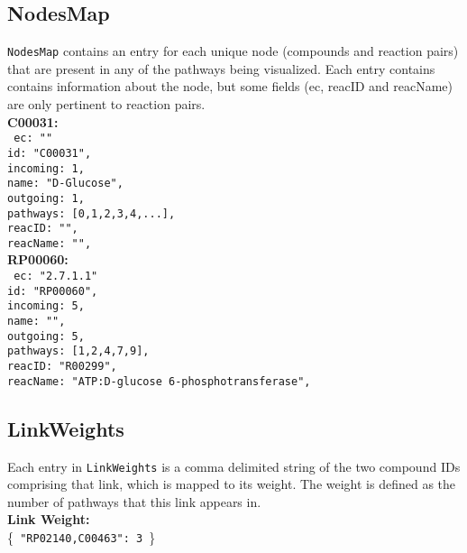 \documentclass{article}
\begin{document}
			\subsection{NodesMap}
			\texttt{NodesMap} contains an entry for each unique node (compounds and reaction pairs) that are present in any of the pathways being visualized. Each entry contains contains information about the node, but some fields (ec, reacID and reacName) are only pertinent to reaction pairs.\\
			
			\noindent \textbf{C00031:}\\
				\texttt{
					\indent ec:	"" \\
					\indent id:	"C00031",\\
					\indent incoming: 1,\\
					\indent name:	"D-Glucose",\\
					\indent outgoing: 1,\\
					\indent pathways: [0,1,2,3,4,...],\\
					\indent reacID:	"",\\
					\indent reacName: "",\\
				}
			\noindent \textbf{RP00060:}\\
				\texttt{
					\indent ec:	"2.7.1.1" \\
					\indent id:	"RP00060",\\
					\indent incoming: 5,\\
					\indent name:	"",\\
					\indent outgoing: 5,\\
					\indent pathways: [1,2,4,7,9],\\
					\indent reacID:	"R00299",\\
					\indent reacName: "ATP:D-glucose 6-phosphotransferase",\\
				}
				
			\subsection{LinkWeights}
			Each entry in \texttt{LinkWeights} is a comma delimited string of the two compound IDs comprising that link, which is mapped to its weight. The weight is defined as the number of pathways that this link appears in.\\
			
			\noindent \textbf{Link Weight:}\\
				\indent \{\texttt{
					 "RP02140,C00463": 3
				}\}
			
\end{document}
